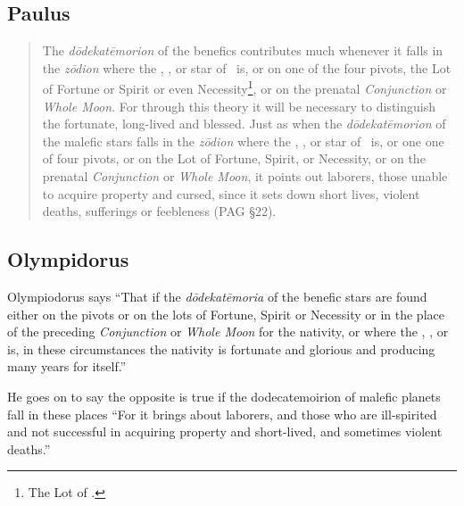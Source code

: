 \subsection{Paulus}
\begin{quote}
The \textsl{d\=odekat\=emorion} of the benefics contributes much whenever it falls in the \textsl{z\=odion} where the \Sun, \Moon, or star of \Mercury\, is, or on one of the four pivots, the Lot of Fortune or Spirit or even Necessity\footnote{The Lot of \Mercury.}, or on the prenatal \textsl{Conjunction} or \textsl{Whole Moon}. For through this theory it will be necessary to distinguish the fortunate, long-lived and blessed. Just as when the \textsl{d\=odekat\=emorion} of the malefic stars falls in the \textsl{z\=odion} where the \Sun, \Moon, or star of \Mercury\, is, or one one of four pivots, or on the Lot of Fortune, Spirit, or Necessity, or on the prenatal \textsl{Conjunction} or \textsl{Whole Moon}, it points out laborers, those unable to acquire property and cursed, since it sets down short lives, violent deaths, sufferings or feebleness (PAG \S22).
\end{quote}

\subsection{Olympidorus}
Olympiodorus says ``That if the \textsl{d\={o}dekat\={e}moria} of the benefic stars are found either on the pivots or on the lots of Fortune, Spirit or Necessity or in the place of the preceding \textsl{Conjunction} or \textsl{Whole Moon} for the nativity, or where the \Sun, \Moon, or \Mercury\, is, in these circumstances the nativity is fortunate and glorious and producing many years for itself.''

He goes on to say the opposite is true if the dodecatemoirion of malefic planets fall in these places ``For it brings about laborers, and those who are ill-spirited and not successful in acquiring property and short-lived, and sometimes violent deaths.'' 
